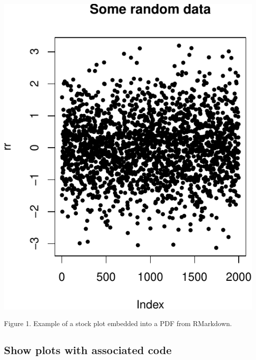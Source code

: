 \documentclass[portrait]{article}
\begin{document}
\includegraphics{Lesson5_rmd_files/figure-latex/unnamed-chunk-1-1.pdf}

Figure 1. Example of a stock plot embedded into a PDF from RMarkdown.

\newpage  

\subsection{Show plots with associated
code}\label{show-plots-with-associated-code}
\end{document}
